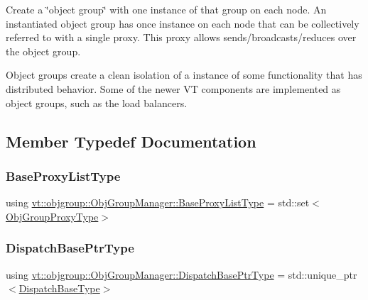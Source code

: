 Create a \char`\"{}object group\char`\"{} with one instance of that group on each node. An instantiated object group has once instance on each node that can be collectively referred to with a single proxy. This proxy allows sends/broadcasts/reduces over the object group.

Object groups create a clean isolation of a instance of some functionality that has distributed behavior. Some of the newer VT components are implemented as object groups, such as the load balancers. 

\subsection{Member Typedef Documentation}
\mbox{\label{structvt_1_1objgroup_1_1_obj_group_manager_a497383a759f7426e824b4f7475b3d5d3}} 
\subsubsection{\texorpdfstring{Base\+Proxy\+List\+Type}{BaseProxyListType}}
{\footnotesize\ttfamily using \hyperlink{structvt_1_1objgroup_1_1_obj_group_manager_a497383a759f7426e824b4f7475b3d5d3}{vt\+::objgroup\+::\+Obj\+Group\+Manager\+::\+Base\+Proxy\+List\+Type} =  std\+::set$<$\hyperlink{namespacevt_ad7cae989df485fccca57f0792a880a8e}{Obj\+Group\+Proxy\+Type}$>$}

\mbox{\label{structvt_1_1objgroup_1_1_obj_group_manager_a8f2ded4cfa63faa119c2bd550764878f}} 
\subsubsection{\texorpdfstring{Dispatch\+Base\+Ptr\+Type}{DispatchBasePtrType}}
{\footnotesize\ttfamily using \hyperlink{structvt_1_1objgroup_1_1_obj_group_manager_a8f2ded4cfa63faa119c2bd550764878f}{vt\+::objgroup\+::\+Obj\+Group\+Manager\+::\+Dispatch\+Base\+Ptr\+Type} =  std\+::unique\+\_\+ptr$<$\hyperlink{structvt_1_1objgroup_1_1_obj_group_manager_ae89a82f6bfca9bbd007791f1cac88f8f}{Dispatch\+Base\+Type}$>$}


